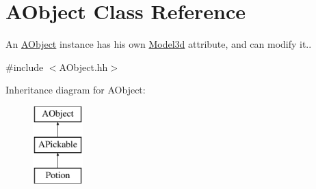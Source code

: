 \hypertarget{classAObject}{}\section{A\+Object Class Reference}
\label{classAObject}


An \hyperlink{classAObject}{A\+Object} instance has his own \hyperlink{classModel3d}{Model3d} attribute, and can modify it..  




{\ttfamily \#include $<$A\+Object.\+hh$>$}

Inheritance diagram for A\+Object\+:\begin{figure}[H]
\begin{center}
\leavevmode
\includegraphics[height=3.000000cm]{classAObject}
\end{center}
\end{figure}
